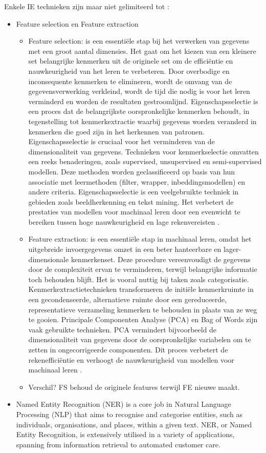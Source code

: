 Enkele IE technieken zijn maar niet gelimiteerd tot \autocite{IBM2024}:
\begin{itemize}
  \item Feature selection en Feature extraction
  \begin{itemize}
    \item Feature selection: is een essentiële stap bij het verwerken van gegevens met een groot aantal dimensies. Het gaat om het kiezen van een kleinere set belangrijke kenmerken uit de originele set om de efficiëntie en nauwkeurigheid van het leren te verbeteren. Door overbodige en inconsequente kenmerken te elimineren, wordt de omvang van de gegevensverwerking verkleind, wordt de tijd die nodig is voor het leren verminderd en worden de resultaten gestroomlijnd. Eigenschapsselectie is een proces dat de belangrijkste oorspronkelijke kenmerken behoudt, in tegenstelling tot kenmerkextractie waarbij gegevens worden veranderd in kenmerken die goed zijn in het herkennen van patronen. Eigenschapsselectie is cruciaal voor het verminderen van de dimensionaliteit van gegevens. Technieken voor kenmerkselectie omvatten een reeks benaderingen, zoals supervised, unsupervised en semi-supervised modellen. Deze methoden worden geclassificeerd op basis van hun associatie met leermethoden (filter, wrapper, inbeddingsmodellen) en andere criteria. Eigenschapsselectie is een veelgebruikte techniek in gebieden zoals beeldherkenning en tekst mining. Het verbetert de prestaties van modellen voor machinaal leren door een evenwicht te bereiken tussen hoge nauwkeurigheid en lage rekenvereisten \autocite{CAI201870}.
    \item Feature extraction: is een essentiële stap in machinaal leren, omdat het uitgebreide invoergegevens omzet in een beter hanteerbare en lager-dimensionale kenmerkenset. Deze procedure vereenvoudigt de gegevens door de complexiteit ervan te verminderen, terwijl belangrijke informatie toch behouden blijft. Het is vooral nuttig bij taken zoals categorisatie. Kenmerkextractietechnieken transformeren de initiële kenmerkruimte in een gecondenseerde, alternatieve ruimte door een gereduceerde, representatieve verzameling kenmerken te behouden in plaats van ze weg te gooien. Principale Componenten Analyse (PCA) en Bag of Words zijn vaak gebruikte technieken. PCA vermindert bijvoorbeeld de dimensionaliteit van gegevens door de oorspronkelijke variabelen om te zetten in ongecorrigeerde componenten. Dit proces verbetert de rekenefficiëntie en verhoogt de nauwkeurigheid van modellen voor machinaal leren \autocite{Mustazzihim}.
    \item Verschil? FS behoud de originele features terwijl FE nieuwe maakt.
  \end{itemize}
    \item Named Entity Recognition (NER) is a core job in Natural Language Processing (NLP) that aims to recognise and categorise entities, such as individuals, organisations, and places, within a given text. NER, or Named Entity Recognition, is extensively utilised in a variety of applications, spanning from information retrieval to automated customer care.


\end{itemize}
